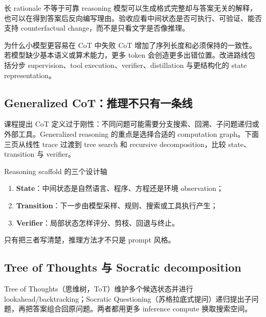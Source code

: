 \begin{warningbox}{长 rationale 不等于可靠 reasoning}
模型可以生成格式完整却与答案无关的解释，也可以在得到答案后反向编写理由。验收应看中间状态是否可执行、可验证、能否支持 counterfactual change，而不是只看文字是否像推理。
\end{warningbox}


\begin{knowledgebox}{为什么小模型更容易在 CoT 中失败}
CoT 增加了序列长度和必须保持的一致性。若模型缺少基本语义或算术能力，更多 token 会创造更多出错位置。改进路线包括分步 supervision、tool execution、verifier、distillation 与更结构化的 state representation。
\end{knowledgebox}

\subsection{Generalized CoT：推理不只有一条线}

课程提出 CoT 定义过于刚性：不同问题可能需要分支搜索、回溯、子问题递归或外部工具。Generalized reasoning 的重点是选择合适的 computation graph。下面三页从线性 trace 过渡到 tree search 和 recursive decomposition，比较 state、transition 与 verifier。


\begin{importantbox}{Reasoning scaffold 的三个设计轴}
\begin{enumerate}
  \item \textbf{State}：中间状态是自然语言、程序、方程还是环境 observation；
  \item \textbf{Transition}：下一步由模型采样、规则、搜索或工具执行产生；
  \item \textbf{Verifier}：局部状态怎样评分、剪枝、回退与终止。
\end{enumerate}
只有把三者写清楚，推理方法才不只是 prompt 风格。
\end{importantbox}

\subsection{Tree of Thoughts 与 Socratic decomposition}

Tree of Thoughts（思维树，ToT）维护多个候选状态并进行 lookahead/backtracking；Socratic Questioning（苏格拉底式提问）递归提出子问题，再把答案组合回原问题。两者都用更多 inference compute 换取搜索空间。

